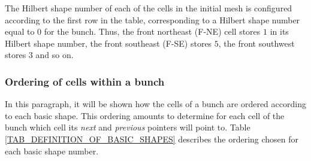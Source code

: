 The Hilbert shape number of each of the cells in the initial mesh is
configured according to the first row in the table, corresponding to
a Hilbert shape number equal to $0$ for the bunch. Thus, the front
northeast (F-NE) cell stores $1$ in its Hilbert shape number, the
front southeast (F-SE) stores $5$, the front southwest stores $3$
and so on.

\subsubsection{Ordering of cells within a bunch}

In this paragraph, it will be shown how the cells of a bunch are
ordered according to each basic shape. This ordering amounts to
determine for each cell of the bunch which cell its \textit{next}
and \textit{previous} pointers will point to. Table
\ref{TAB_DEFINITION_OF_BASIC_SHAPES} describes the ordering chosen
for each basic shape number.

